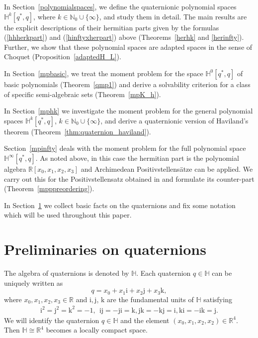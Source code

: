 \documentclass[11pt,a4paper]{amsart}
\theoremstyle{definition}
\begin{document}
In Section~\ref{polynomialspaces}, we define the quaternionic polynomial
spaces $ \mathbb{H}^{k}[q^{*}, q]$, where
$k\in \mathbb{N}_{0}\cup \{\infty \}$, and study them in detail. The main
results are the explicit descriptions of their hermitian parts given by
the formulas (\ref{hhherkpart}) and (\ref{hinftyxherpart}) above (Theorems~\ref{herhk} and \ref{herinfty}). Further, we show that these polynomial
spaces are adapted spaces in the sense of Choquet (Proposition~\ref{adaptedH_L}).

In Section~\ref{mpbasic}, we treat the moment problem for the space
$ \mathbb{H}^{0}[q^{*}, q]$ of basic polynomials (Theorem~\ref{qmp1}) and
derive a solvability criterion for a class of specific semi-algebraic sets
(Theorem~\ref{mpK_h}).

In Section~\ref{mphk} we investigate the moment problem for the general
polynomial spaces $ \mathbb{H}^{k}[q^{*}, q]$,
$k\in \mathbb{N}_{0}\cup \{\infty \}$, and derive a quaternionic version
of Haviland's theorem (Theorem~\ref{thm:quaternion_haviland}).

Section~\ref{mpinfty} deals with the moment problem for the full polynomial
space $ \mathbb{H}^{\infty}[q^{*}, q]$. As noted above, in this case the
hermitian part is the polynomial algebra
$\mathbb{R}[x_{0},x_{1},x_{2},x_{3}]$ and Archimedean Positivstellens\"atze
can be applied. We carry out this for the Positivstellensatz obtained in
\cite{Schmudgen1991} and formulate its counter-part (Theorem~\ref{mpppreordering}).

In Section~\ref{prelim} we collect basic facts on the quaternions and fix
some notation which will be used throughout this paper.

\section{Preliminaries on quaternions}
\label{prelim}

The algebra of quaternions is denoted by $\mathbb{H}$. Each quaternion
$q \in \mathbb{H}$ can be uniquely written as
%
\begin{equation*}
q = x_{0} + x_{1} \mathrm{i}+ x_{2} \mathrm{j}+ x_{3} \mathrm{k},
\end{equation*}
%
where $x_{0}, x_{1}, x_{2}, x_{3} \in \mathbb{R}$ and
$\mathrm{i}, \mathrm{j}$, $\mathrm{k}$ are the fundamental units of
$\mathbb{H}$ satisfying
%
\begin{align}
\label{qxx}
\mathrm{i}^{2}= \mathrm{j}^{2}=\mathrm{k}^{2}=-1,~~ \mathrm{i}
\mathrm{j}=-\mathrm{j}\mathrm{i}=\mathrm{k}, \mathrm{j}\mathrm{k}=-
\mathrm{k}\mathrm{j}=\mathrm{i}, \mathrm{k}\mathrm{i}=-\mathrm{i}
\mathrm{k}=\mathrm{j}.
\end{align}
%
We will identify the quaternion $q\in \mathbb{H}$ and the element
$(x_{0},x_{1},x_{2},x_{2})\in \mathbb{R}^{4}$. Then
$\mathbb{H}\cong \mathbb{R}^{4}$ becomes a locally compact space.
\end{document}
